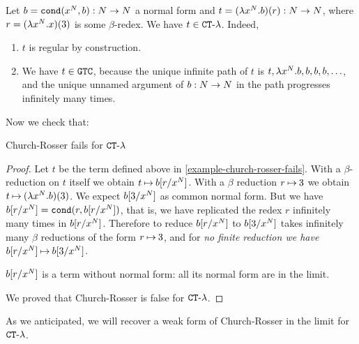 \begin{Eg}
\label{example-church-rosser-fails}
Let $b = {\tt cond}(x^{{N}},b):{N} \rightarrow {N}$ a normal form
and $t = (\lambda x^{{N}}.b)(r):{N} \rightarrow {N}$, 
where $r = (\lambda x^{{N}}.x)(3)$ is some $\beta$-redex. 
We have $t \in { {\tt CT} \mbox{-} \lambda}$. Indeed, 
\begin{enumerate}
\item
$t$ is regular by construction.
\item
We have $t \in {\tt GTC}$, because the unique infinite path of $t$ is 
$t, \lambda x^{{N}}.b, b, b, b, \ldots$, and the
unique unnamed argument of $b:{N} \rightarrow {N}$ in the path progresses infinitely many times.
\end{enumerate}
\end{Eg}

Now we check that:


\begin{lemma}
Church-Rosser fails for ${ {\tt CT} \mbox{-} \lambda}$
\end{lemma}


\begin{proof}
Let $t$ be the term defined above in \ref{example-church-rosser-fails}.
With a $\beta$-reduction on $t$ itself we obtain $t \mathbin{\mapsto} b[r/x^{N}]$.
With a $\beta$ reduction $r \mathbin{\mapsto} 3$ we obtain $t \mathbin{\mapsto}  (\lambda x^{{N}}.b)(3)$.
We expect $b[3/x^{N}]$ as common normal form. But we have $b[r/x^{N}] = {\tt cond}(r,b[r/x^{N}])$,
that is, we have replicated the redex $r$ infinitely many times in $b[r/x^{N}]$. Therefore to reduce 
$b[r/x^{N}]$ to $b[3/x^{N}]$ takes infinitely many $\beta$ reductions of the form $r \mathbin{\mapsto} 3$, 
and for \emph{no finite reduction we have} $b[r/x^{N}] \mathbin{\mapsto} b[3/x^{N}]$. 

$b[r/x^{N}]$ is a term without normal form: all its normal form are in the limit.

We proved that Church-Rosser is false for ${ {\tt CT} \mbox{-} \lambda}$.
\end{proof}

As we anticipated, we will recover a weak form of Church-Rosser in the limit for ${ {\tt CT} \mbox{-} \lambda}$.

